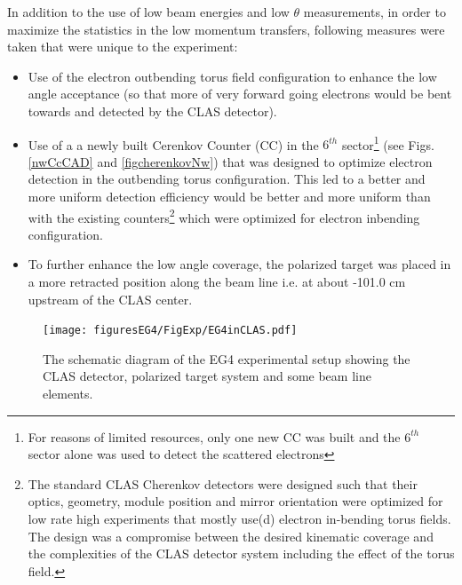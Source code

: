 In addition to the use of low beam energies and low $\theta$ measurements, in order to maximize the statistics in the low momentum transfers, following measures were taken that were unique to the experiment:
\begin{itemize}
\item Use of the electron outbending torus field configuration to enhance the low angle acceptance (so that more of very forward going electrons would be bent towards and detected by the CLAS detector).
\item Use of a a newly built Cerenkov Counter (CC) in the $6^{th}$ sector\footnote{For reasons of limited resources, only one new CC was built and the $6^{th}$ sector alone was used to detect the scattered electrons} (see Figs. \ref{nwCcCAD} and \ref{figcherenkovNw}) that was designed to optimize electron detection in the outbending torus configuration. %
This led to a better and more uniform %
  detection efficiency would be better and more uniform than with the existing counters\footnote{The standard CLAS Cherenkov detectors were designed such that their optics, geometry, module position and mirror orientation were optimized for low rate high \qsq experiments that mostly use(d) electron in-bending torus fields. The design was a compromise between the desired kinematic coverage and the complexities of the CLAS detector system including the effect of the torus field.} which were optimized for electron inbending configuration. 
\item To further enhance the low angle coverage, the polarized target was placed in a more retracted position along the beam line i.e. at about -101.0 cm upstream of the CLAS center.
\end{itemize}

\begin{figure}[h] %
\centering
\leavevmode \texttt{[image: figuresEG4/FigExp/EG4inCLAS.pdf]}  %
\caption[The EG4 setup]{The schematic diagram of the EG4 experimental setup showing the CLAS detector, polarized target system and some beam line elements. }
\label{EG4inCLAS}%
\end{figure}

